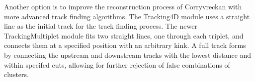 Another option is to improve the reconstruction process of Corryvreckan with more advanced track finding algorithms. The Tracking4D module uses a straight line as the initial track for
the track finding process. The newer TrackingMultiplet module fits two straight lines, one through each triplet, and connects them at a specified position with an arbitrary kink.
A full track forms by connecting the upstream and downstream tracks with the lowest distance and within specifed cuts, allowing for further rejection of false combinations
of clusters.
